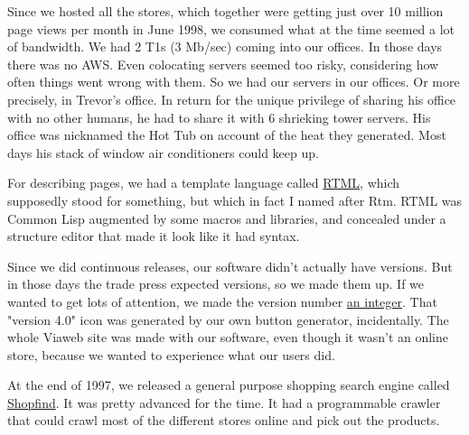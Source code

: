 Since we
                  hosted all the stores, which together were getting just over
                  10 million page views per month in June 1998, we consumed what
                  at the time seemed a lot of bandwidth. We had 2 T1s (3 Mb/sec)
                  coming into our offices. In those days there was no AWS. Even
                  colocating servers seemed too risky, considering how often
                  things went wrong with them. So we had our servers in our
                  offices. Or more precisely, in Trevor's office. In return for
                  the unique privilege of sharing his office with no other
                  humans, he had to share it with 6 shrieking tower servers. His
                  office was nicknamed the Hot Tub on account of the heat they
                  generated. Most days his stack of window air conditioners
                  could keep up.

For describing pages, we had a
                  template language called
                  \href{http://ycombinator.com/viaweb/rtml.html}{RTML},
                  which supposedly stood for something, but which in fact I
                  named after Rtm. RTML was Common Lisp augmented by some macros
                  and libraries, and concealed under a structure editor that
                  made it look like it had syntax.

Since we did
                  continuous releases, our software didn't actually have
                  versions. But in those days the trade press expected versions,
                  so we made them up. If we wanted to get lots of attention, we
                  made the version number
                  \href{http://www.ycombinator.com/viaweb/rel4.html}{an integer}. That "version 4.0" icon was generated by our own button
                  generator, incidentally. The whole Viaweb site was made with
                  our software, even though it wasn't an online store, because
                  we wanted to experience what our users did.

At the
                  end of 1997, we released a general purpose shopping search
                  engine called
                  \href{http://ycombinator.com/viaweb/shoprel.html}{Shopfind}. It was pretty advanced for the time. It had a programmable
                  crawler that could crawl most of the different stores online
                  and pick out the products.


              
            
          
            
              
                


                  
              
            
          
